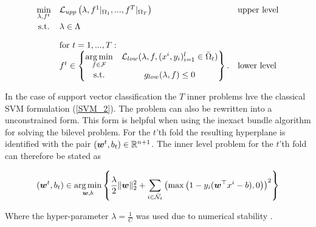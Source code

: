 
\begin{equation}
	\begin{array}{cll}
	\displaystyle\min_{\lambda, f^t} & \mathcal{L}_{upp}\left(\lambda,f^1|_{\Omega_1},...,f^T|_{\Omega_T}\right) & \text{upper level} \vspace{0.5ex}\\
	\text{s.t.} & \lambda \in \Lambda & \vspace{1em}\\
	& \text{for } t = 1,...,T: & \\
	& f^t \in \begin{Bmatrix} \displaystyle\argmin_{f\in \mathcal{F}} & \mathcal{L}_{low}(\lambda,f,(x^i,y_i)_{i = 1}^l\in \bar{\Omega}_t) \vspace{0.5ex}\\
	                        \text{s.t.} & g_{low}(\lambda,f) \leq 0 
													\end{Bmatrix}. & \text{lower level}
	\end{array}
\end{equation}

In the case of support vector classification the \(T\) inner problems hve the classical SVM formulation %
(\ref{SVM_2}). %
The problem can also be rewritten into a unconstrained form. This form is helpful when using the inexact bundle algorithm for solving the bilevel problem.
For the \(t\)'th fold the resulting hyperplane is identified with the pair \((\bm{w}^t,b_t) \in \mathbb{R}^{n+1}\).
The inner level problem for the \(t\)'th fold can therefore be stated as



\begin{equation}
	(\bm{w}^t,b_t) \in \operatorname*{arg\,min}_{\bm{w},b} \left\{\frac{\lambda}{2} \|\bm{w}\|^2_2+\sum_{i\in \bar{\mathcal{N}}_t}{\left(\max\left(1-y_i(\bm{w}^{\top}x^i-b),0\right)\right)^2}\right\}
\label{lower_t_2}
\end{equation}

Where the hyper-parameter \(\lambda = \frac{1}{C}\) was used  due to numerical stability \cite{Kunapuli2008}.

